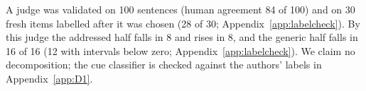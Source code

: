 A judge was validated on 100 sentences (human agreement 84 of 100) and on 30 fresh items labelled after it was chosen (28 of 30; Appendix~\ref{app:labelcheck}). By this judge the addressed half falls in 8 and rises in 8, and the generic half falls in 16 of 16 (12 with intervals below zero; Appendix~\ref{app:labelcheck}). We claim no decomposition; the cue classifier is checked against the authors' labels in Appendix~\ref{app:D1}.
